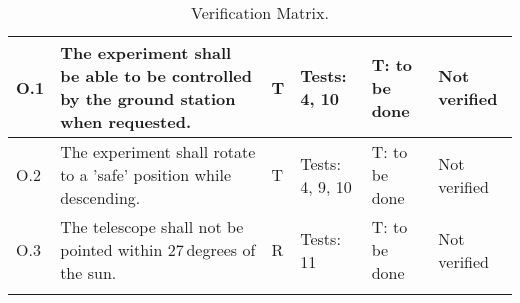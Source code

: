 \begin{longtable}[]{|m{}| m{}|m{}|m{}|m{}|m{}|}
O.1 & The experiment shall be able to be controlled by the ground station when requested.
& T & Tests: 4, 10 & T: to be done & Not verified \\\hline

O.2 & The experiment shall rotate to a 'safe' position while descending.
& T & Tests: 4, 9, 10 & T: to be done & Not verified \\\hline

 O.3 & The telescope shall not be pointed within 27\,degrees of the sun.
& R & Tests: 11 & T: to be done & Not verified \\\hline

\caption{Verification Matrix.}
\label{tab:var-mat}
\end{longtable}
\raggedbottom
